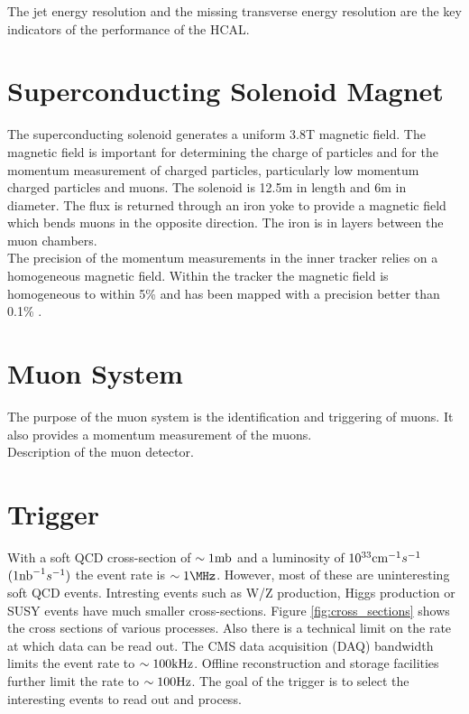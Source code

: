 The jet energy resolution and the missing transverse energy resolution are the 
key indicators of the performance of the HCAL. \\

\section{Superconducting Solenoid Magnet}

The superconducting solenoid generates a uniform 3.8T magnetic field. The 
magnetic field is important for determining the charge of particles and for the 
momentum measurement of charged particles, particularly low momentum charged 
particles and muons. The solenoid is 12.5m in length and 6m in diameter. The flux 
is returned through an iron yoke to provide a magnetic field which bends muons in 
the opposite direction. The iron is in layers between the muon chambers. \\

The precision of the momentum measurements in the inner tracker relies on a
homogeneous magnetic field. Within the tracker the magnetic field is homogeneous
to within 5\% \cite{field_measurement} and has been mapped with a precision 
better than 0.1\% \cite{field_uniformity}.

\section{Muon System}

The purpose of the muon system is the identification and triggering of muons. It
also provides a momentum measurement of the muons. \\

Description of the muon detector.

\section{Trigger}

With a soft QCD cross-section of $\sim1\mbox{mb}$ and a luminosity of
$10^{33}\mbox{cm}^{-1}s^{-1}$ $(1\mbox{nb}^{-1} s^{-1})$ the event rate is $\sim 1 \MHz$. 
However, most of these are uninteresting soft QCD events. Intresting events such
as W/Z production, Higgs production or SUSY events have much smaller 
cross-sections. Figure \ref{fig:cross_sections} shows the cross sections of
various processes. Also there is a technical limit on the rate at which data can
be read out. The CMS data acquisition (DAQ) bandwidth limits the event rate to 
$\sim 100\mbox{kHz}$. Offline reconstruction and storage facilities further limit the
rate to $\sim 100\mbox{Hz}$. The goal of the trigger is to select the interesting 
events to read out and process. \\

